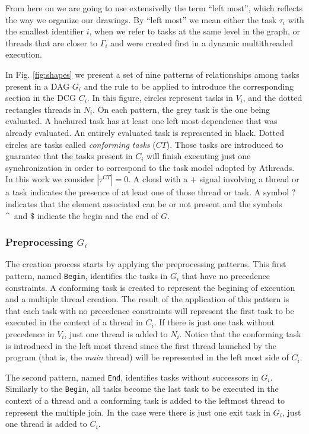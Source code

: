 \documentclass[twocolumn]{svjour3}
\begin{document}
From here on we are going to use extensivelly the term ``left most'', which reflects the way we organize our drawings. By ``left most'' we mean either the task $\tau_i$ with the smallest identifier $i$, when we refer to tasks at the same level in the graph, or threads that are closer to $\Gamma_i$ and were created first in a dynamic multithreaded execution.

In Fig. \ref{fig:shapes} we present a set of nine patterns of relationships among tasks present in a DAG $G_i$ and the rule to be applied to introduce the corresponding section in the DCG $C_i$. In this figure, circles represent tasks in $V_i$, and the dotted rectangles threads in $N_i$. On each pattern, the grey task is the one being evaluated. A hachured task has at least one left most dependence that was already evaluated. An entirely evaluated task is represented in black. Dotted circles are tasks called {\em conforming tasks} ($CT$). Those tasks are introduced to guarantee that the tasks present in $C_i$ will finish executing just one synchronization in order to correspond to the task model adopted by Athreads. In this work we consider $ |\tau^{CT}| = 0 $. A cloud with a $+$ signal involving a thread or a task indicates the presence of at least one of those thread or task.
A symbol $?$ indicates that the element associated can be or not present and the symbols \^~and $\$$ indicate the begin and the end of $G$.

\subsubsection{Preprocessing $G_i$}

The creation process starts by applying the preprocessing patterns. This first pattern, named \verb+Begin+, identifies the tasks in $G_i$ that have no precedence constraints. A conforming task is created to represent the begining of execution and a multiple thread creation. The result of the application of this pattern is that each task with no precedence constraints will represent the first task to be executed in the context of a thread in $C_i$. If there is just one task without precedence in $V_i$, just one thread is added to $N_i$. Notice that the conforming task is introduced in the left most thread since the first thread launched by the program (that is, the {\em main} thread) will be represented in the left most side of $C_i$.

The second pattern, named \verb+End+, identifies tasks without successors in $G_i$. Similarly to the \verb+Begin+, all tasks become the last task to be executed in the context of a thread and a conforming task is added to the leftmost thread to represent the multiple join. In the case were there is just one exit task in $G_i$, just one thread is added to $C_i$. 
\end{document}
